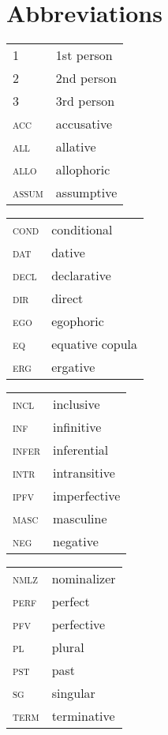 \documentclass[output=paper]{langsci/langscibook}
\begin{document}
\section*{Abbreviations}
\begin{tabularx}{.45\textwidth}{lQ}
1	&	1st person	\\
2	&	2nd person	\\
3	&	3rd person	\\
\textsc{acc} 	&	accusative	\\
\textsc{all}	&	allative	\\
\textsc{allo}	&	allophoric	\\
\textsc{assum}	&	assumptive	\\
\end{tabularx}
\begin{tabularx}{.45\textwidth}{lQ}
\textsc{cond}	&	conditional	\\
\textsc{dat}	&	dative	\\
\textsc{decl}	&	declarative	\\
\textsc{dir}	&	direct	\\
\textsc{ego}	&	egophoric	\\
\textsc{eq}	&	equative copula	\\
\textsc{erg}	&	ergative	\\
\end{tabularx}

\begin{tabularx}{.45\textwidth}{lQ}
\textsc{incl}	&	inclusive	\\
\textsc{inf}	&	infinitive	\\
\textsc{infer}	&	inferential	\\
\textsc{intr}	&	intransitive	\\
\textsc{ipfv}	&	imperfective	\\
\textsc{masc}	&	masculine	\\
\textsc{neg}	&	negative	\\
\end{tabularx}
\begin{tabularx}{.45\textwidth}{lQ}
\textsc{nmlz}	&	nominalizer	\\
\textsc{perf}	&	perfect	\\
\textsc{pfv}	&	perfective	\\
\textsc{pl}	&	plural	\\
\textsc{pst}	&	past	\\
\textsc{sg}	&	singular	\\
\textsc{term}	&	terminative	\\
\end{tabularx}



\sloppy
\printbibliography[heading=subbibliography,notkeyword=this] 
\end{document}
